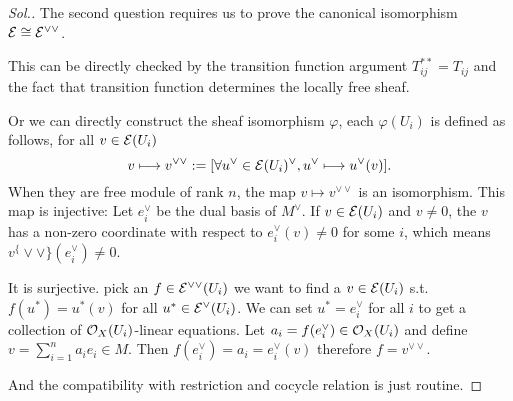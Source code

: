 \documentclass[11pt]{book} %
\begin{document}
\begin{proof}[Sol.]
The second question requires us to prove the canonical isomorphism ${\cal E}\cong{\cal E}^{\vee\vee}$.

This can be directly checked by the transition function argument $T_{ij}^{**}=T_{ij}$ and the fact that transition function determines the locally free sheaf.

Or we can directly construct the sheaf isomorphism $\varphi$, each $\varphi(U_i)$ is defined as follows, for all $v\in {\cal E}(U_i)$
$$
v\longmapsto v^{\vee\vee}:=[\forall u^\vee\in {\cal E}(U_i)^\vee, u^\vee\longmapsto u^\vee(v)].
$$
When they are free module of rank $n$, the map $v\mapsto v^{\vee\vee}$ is an isomorphism. This map is injective: Let $e_i^\vee$ be the dual basis of $M^\vee$. If $v\in {\cal E}(U_i)$ and $v\neq 0$, the $v$ has a non-zero coordinate with respect to $e_i^{\vee}(v)\neq 0$ for some $i$, which means $v^\{\vee\vee\}(e_i^\vee)\neq 0$.

It is surjective. pick an $f\in {\cal E}^{\vee\vee}(U_i)$ we want to find a $v\in {\cal E}(U_i)$ s.t. $f(u^*)=u^*(v)$ for all $u^*\in {\cal E}^\vee(U_i)$. We can set $u^*=e_i^\vee$ for all $i$ to get a collection of ${\cal O}_X(U_i)$-linear equations. Let $a_i=f(e_i^\vee)\in {\cal O}_X(U_i)$ and define $v=\sum^n_{i=1}a_i e_i\in M$. Then $f(e_i^\vee)=a_i=e_i^\vee(v)$ therefore $f=v^{\vee\vee}$.

And the compatibility with restriction and cocycle relation is just routine.
\end{proof}
\end{document}
